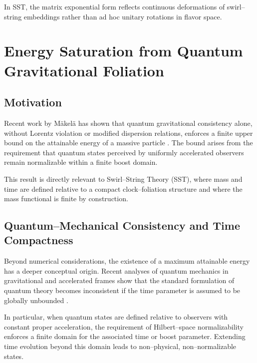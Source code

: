 \documentclass[11pt]{article}
\begin{document}
            In SST, the matrix exponential form reflects continuous deformations of
            swirl--string embeddings rather than ad hoc unitary rotations in flavor space.

    \section{Energy Saturation from Quantum Gravitational Foliation}
        \label{app:energy_saturation}

        \subsection{Motivation}

            Recent work by M\"akel\"a has shown that quantum gravitational consistency alone,
            without Lorentz violation or modified dispersion relations, enforces a finite
            upper bound on the attainable energy of a massive particle
            \cite{Makela2024QuantumGravity}.
            The bound arises from the requirement that quantum states perceived by uniformly
            accelerated observers remain normalizable within a finite boost domain.

            This result is directly relevant to Swirl--String Theory (SST), where mass and
            time are defined relative to a compact clock--foliation structure and where the
            mass functional is finite by construction.

        \subsection{Quantum--Mechanical Consistency and Time Compactness}

            Beyond numerical considerations, the existence of a maximum attainable energy
            has a deeper conceptual origin. Recent analyses of quantum mechanics in
            gravitational and accelerated frames show that the standard formulation of
            quantum theory becomes inconsistent if the time parameter is assumed to be
            globally unbounded \cite{DiBiagio2021EmergentTime}.

            In particular, when quantum states are defined relative to observers with
            constant proper acceleration, the requirement of Hilbert--space
            normalizability enforces a finite domain for the associated time or boost
            parameter. Extending time evolution beyond this domain leads to non--physical,
            non--normalizable states.
\end{document}
